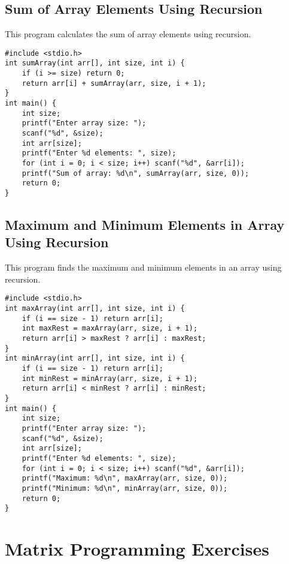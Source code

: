 \documentclass[a4paper,12pt]{article}
\begin{document}
\subsection{Sum of Array Elements Using Recursion}
This program calculates the sum of array elements using recursion.
\begin{lstlisting}[caption={Sum of Array Elements Using Recursion}]
#include <stdio.h>
int sumArray(int arr[], int size, int i) {
    if (i >= size) return 0;
    return arr[i] + sumArray(arr, size, i + 1);
}
int main() {
    int size;
    printf("Enter array size: ");
    scanf("%d", &size);
    int arr[size];
    printf("Enter %d elements: ", size);
    for (int i = 0; i < size; i++) scanf("%d", &arr[i]);
    printf("Sum of array: %d\n", sumArray(arr, size, 0));
    return 0;
}
\end{lstlisting}
\clearpage

\subsection{Maximum and Minimum Elements in Array Using Recursion}
This program finds the maximum and minimum elements in an array using recursion.
\begin{lstlisting}[caption={Maximum and Minimum Elements in Array Using Recursion}]
#include <stdio.h>
int maxArray(int arr[], int size, int i) {
    if (i == size - 1) return arr[i];
    int maxRest = maxArray(arr, size, i + 1);
    return arr[i] > maxRest ? arr[i] : maxRest;
}
int minArray(int arr[], int size, int i) {
    if (i == size - 1) return arr[i];
    int minRest = minArray(arr, size, i + 1);
    return arr[i] < minRest ? arr[i] : minRest;
}
int main() {
    int size;
    printf("Enter array size: ");
    scanf("%d", &size);
    int arr[size];
    printf("Enter %d elements: ", size);
    for (int i = 0; i < size; i++) scanf("%d", &arr[i]);
    printf("Maximum: %d\n", maxArray(arr, size, 0));
    printf("Minimum: %d\n", minArray(arr, size, 0));
    return 0;
}
\end{lstlisting}
\clearpage

\section{Matrix Programming Exercises}

\end{document}
